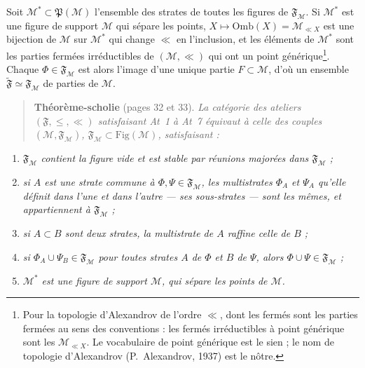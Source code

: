 \documentclass[11pt,a4paper]{article}
\begin{document}
Soit $\mathcal{M}^{*} \subset \mathfrak{P}(\mathcal{M})$ l'ensemble des strates
de toutes les figures de $\mathfrak{F}_{\mathcal{M}}$. Si $\mathcal{M}^{*}$ est
une figure de support $\mathcal{M}$ qui sépare les points, $X \mapsto
\mathrm{Omb}(X) = \mathcal{M}_{\ll X}$ est une bijection de $\mathcal{M}$ sur
$\mathcal{M}^{*}$ qui change $\ll$ en l'inclusion, et les éléments de
$\mathcal{M}^{*}$ sont les parties fermées irréductibles de $(\mathcal{M}, \ll)$
qui ont un point générique\footnote{Pour la topologie d'Alexandrov de l'ordre
$\ll$, dont les fermés sont les parties fermées au sens des conventions : les
fermés irréductibles à point générique sont les $\mathcal{M}_{\ll X}$. Le
vocabulaire de point générique est le sien ; le nom de topologie d'Alexandrov
(P.~Alexandrov, 1937) est le nôtre.}. Chaque $\Phi \in \mathfrak{F}_{\mathcal{M}}$
est alors l'image d'une unique partie $F \subset \mathcal{M}$, d'où un ensemble
$\widetilde{\mathfrak{F}} \simeq \mathfrak{F}_{\mathcal{M}}$ de parties de
$\mathcal{M}$.

\begin{quote}
\textbf{Théorème-scholie} (pages 32 et 33). \emph{La catégorie des ateliers
$(\mathfrak{F}, \leq, \ll)$ satisfaisant At~1 à At~7 équivaut à celle des
couples $(\mathcal{M}, \mathfrak{F}_{\mathcal{M}})$,
$\mathfrak{F}_{\mathcal{M}} \subset \mathrm{Fig}(\mathcal{M})$, satisfaisant :}
\end{quote}
\begin{enumerate}
\item[At$^{*}$1] \emph{$\mathfrak{F}_{\mathcal{M}}$ contient la figure vide et
est stable par réunions majorées dans $\mathfrak{F}_{\mathcal{M}}$ ;}
\item[At$^{*}$2] \emph{si $A$ est une strate commune à $\Phi, \Psi \in
\mathfrak{F}_{\mathcal{M}}$, les multistrates $\Phi_{A}$ et $\Psi_{A}$ qu'elle
définit dans l'une et dans l'autre --- ses sous-strates --- sont les mêmes, et
appartiennent à $\mathfrak{F}_{\mathcal{M}}$ ;}
\item[At$^{*}$3] \emph{si $A \subset B$ sont deux strates, la multistrate de
$A$ raffine celle de $B$ ;}
\item[At$^{*}$4] \emph{si $\Phi_{A} \cup \Psi_{B} \in \mathfrak{F}_{\mathcal{M}}$
pour toutes strates $A$ de $\Phi$ et $B$ de $\Psi$, alors $\Phi \cup \Psi \in
\mathfrak{F}_{\mathcal{M}}$ ;}
\item[At$^{*}$5] \emph{$\mathcal{M}^{*}$ est une figure de support $\mathcal{M}$,
qui sépare les points de $\mathcal{M}$.}
\end{enumerate}
\end{document}
